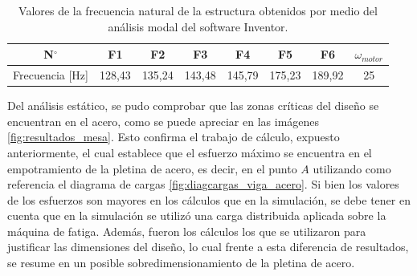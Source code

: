 \begin{table}[h]
\centering
\begin{tabular}{@{}cccccccc@{}}
\toprule
N$^{\circ}$ & F1 & F2 & F3 & F4 & F5 & F6 & $\omega_{motor}$ \\ \midrule
Frecuencia [Hz] & 128,43 & 135,24 & 143,48 & 145,79 & 175,23 & 189,92 & 25 \\ \bottomrule
\end{tabular}
\caption{Valores de la frecuencia natural de la estructura obtenidos por medio del análisis modal del software Inventor. }
\label{tab:frec_nat}
\end{table}

Del análisis estático, se pudo comprobar que las zonas críticas del diseño se encuentran en el acero, como se puede apreciar en las imágenes \ref{fig:resultados_mesa}. Esto confirma el trabajo de cálculo, expuesto anteriormente, el cual establece que el esfuerzo máximo se encuentra en el empotramiento de la pletina de acero, es decir, en el punto $A$ utilizando como referencia el diagrama de cargas \ref{fig:diagcargas_viga_acero}. Si bien los valores de los esfuerzos son mayores en los cálculos que en la simulación, se debe tener en cuenta que en la simulación se utilizó una carga distribuida aplicada sobre la máquina de fatiga. Además, fueron los cálculos los que se utilizaron para justificar las dimensiones del diseño, lo cual frente a esta diferencia de resultados, se resume en un posible sobredimensionamiento de la pletina de acero.

